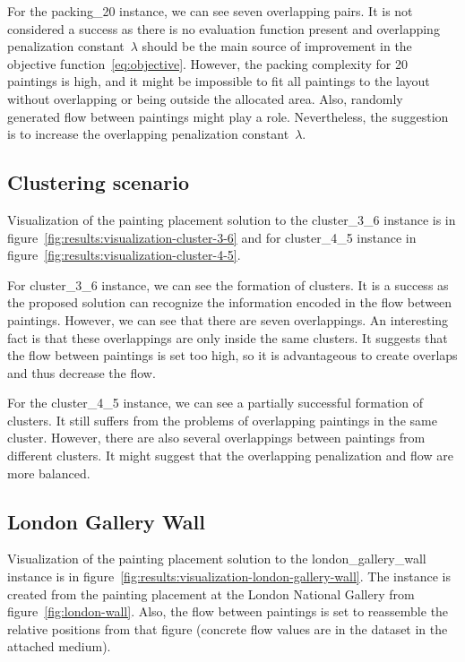 For the packing\_20 instance, we can see seven overlapping pairs.
It is not considered a success as there is no evaluation function present and overlapping penalization constant~$\lambda$
should be the main source of improvement in the objective function~\ref{eq:objective}.
However, the packing complexity for 20 paintings is high, and it might be impossible to fit all paintings to the layout without overlapping or being outside the allocated area.
Also, randomly generated flow between paintings might play a role.
Nevertheless, the suggestion is to increase the overlapping penalization constant~$\lambda$.

\subsection{Clustering scenario}\label{subsec:clustering-scenario}

Visualization of the painting placement solution to the cluster\_3\_6 instance
is in figure~\ref{fig:results:visualization-cluster-3-6}
and for cluster\_4\_5 instance in figure~\ref{fig:results:visualization-cluster-4-5}.

For cluster\_3\_6 instance, we can see the formation of clusters.
It is a success as the proposed solution can recognize
the information encoded in the flow between paintings.
However, we can see that there are seven overlappings.
An interesting fact is that these overlappings are only inside the same clusters.
It suggests that the flow between paintings is set too high,
so it is advantageous to create overlaps and thus decrease the flow.

For the cluster\_4\_5 instance, we can see a partially successful formation of clusters.
It still suffers from the problems of overlapping paintings in the same cluster.
However, there are also several overlappings between paintings from different clusters.
It might suggest that the overlapping penalization and flow are more balanced.

\subsection{London Gallery Wall}\label{subsec:london-gallery-wall}

Visualization of the painting placement solution to the london\_gallery\_wall instance
is in figure~\ref{fig:results:visualization-london-gallery-wall}.
The instance is created from the painting placement at the London National Gallery from figure~\ref{fig:london-wall}.
Also, the flow between paintings is set to reassemble the relative positions from that figure
(concrete flow values are in the dataset in the attached medium).

